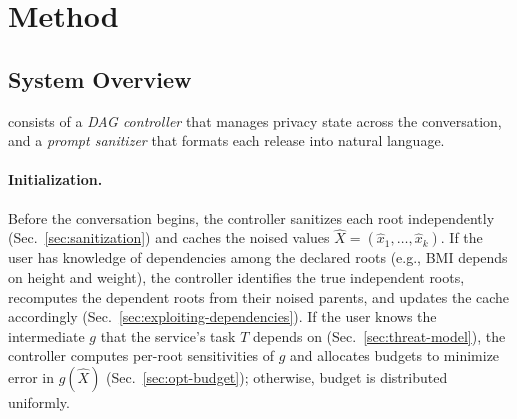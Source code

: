 \section{Method}
\label{sec:method}

\subsection{System Overview}
\label{sec:system}
 
\sysname{} consists of a \emph{DAG controller} that manages privacy state across the conversation, and a \emph{prompt sanitizer} that formats each release into natural language.
 
\paragraph{Initialization.} Before the conversation begins, the controller sanitizes each root independently (Sec.~\ref{sec:sanitization}) and caches the noised values $\hat{X} = (\hat{x}_1, \ldots, \hat{x}_k)$. If the user has knowledge of dependencies among the declared roots (e.g., BMI depends on height and weight), the controller identifies the true independent roots, recomputes the dependent roots from their noised parents, and updates the cache accordingly (Sec.~\ref{sec:exploiting-dependencies}). If the user knows the intermediate $g$ that the service's task $T$ depends on (Sec.~\ref{sec:threat-model}), the controller computes per-root sensitivities of $g$ and allocates budgets to minimize error in $g(\hat{X})$ (Sec.~\ref{sec:opt-budget}); otherwise, budget is distributed uniformly.
 

